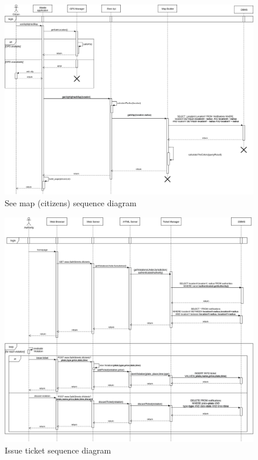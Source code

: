 \documentclass{article}
\begin{document}
	\begin{figure}[h]
	\includegraphics[width=\linewidth]{images/See_Highlighted_Map_Sequence_Diagram.png}
		\caption{See map (citizens) sequence diagram}
	\end{figure}
	\begin{figure}[h]
	\includegraphics[width=\linewidth]{images/Issuing_Tickets_sequence_diagram.png}
		\caption{Issue ticket sequence diagram}
	\end{figure}
	\newpage \FloatBarrier
\end{document}
